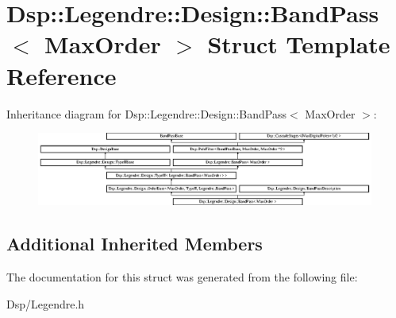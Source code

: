 \hypertarget{structDsp_1_1Legendre_1_1Design_1_1BandPass}{\section{Dsp\-:\-:Legendre\-:\-:Design\-:\-:Band\-Pass$<$ Max\-Order $>$ Struct Template Reference}
\label{structDsp_1_1Legendre_1_1Design_1_1BandPass}
}
Inheritance diagram for Dsp\-:\-:Legendre\-:\-:Design\-:\-:Band\-Pass$<$ Max\-Order $>$\-:\begin{figure}[H]
\begin{center}
\leavevmode
\includegraphics[height=2.408602cm]{structDsp_1_1Legendre_1_1Design_1_1BandPass}
\end{center}
\end{figure}
\subsection*{Additional Inherited Members}


The documentation for this struct was generated from the following file\-:\begin{DoxyCompactItemize}
\item 
Dsp/Legendre.\-h\end{DoxyCompactItemize}
